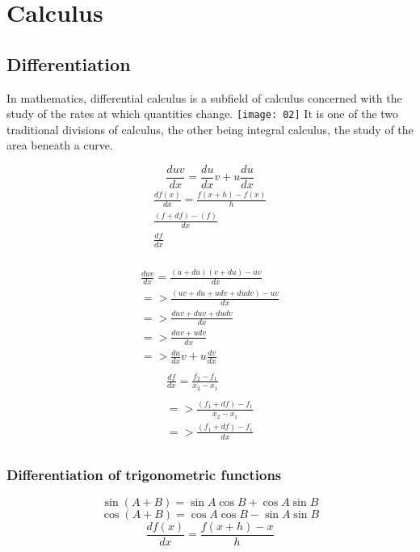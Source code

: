 
\graphicspath{ {./Pictures/} }

\chapter{Calculus}



\section{Differentiation}
	In mathematics, differential calculus is a subfield of calculus concerned with the study of the rates at which quantities change.
	\texttt{[image: 02]}
	It is one of the two traditional divisions of calculus, the other being integral calculus, the study of the area beneath a curve.
	
	
	\begin{equation}
		\frac{duv}{dx}=\frac{du}{dx}v+u\frac{du}{dx}
	\end{equation}
	\begin{align}
		\frac{df(x)}{dx} = \frac{f(x+h)-f(x)}{h} \\
		\frac{(f+df)-(f)}{dx}	\\
		\frac{df}{dx} \\
	\end{align}
	
	\begin{align}
		\frac{duv}{dx} = \frac{(u+du)(v+du)-uv}{dx} \\
		=>\frac{(uv+du+udv+dudv)-uv}{dx} \\
		=> \frac{duv+duv+dudv}{dx} \\
		=> \frac{duv+udv}{dx} \\
		=> \frac{du}{dx}v+u\frac{dv}{dx} \\
	\end{align}
	\begin{align}
		\frac{df}{dx} = \frac{f_2-f_1}{x_2-x_1} \\\\
		=>\frac{(f_1+df)-f_1}{x_2-x_1} \\
		=>\frac{(f_1+df)-f_1}{dx} \\
	\end{align}

	
	
	
	\subsection{Differentiation of trigonometric functions}
	\begin{equation}
		\sin(A+B) = \sin A\cos B+\cos A\sin B
	\end{equation}
	\begin{equation}
		\cos(A+B) = \cos A\cos B - \sin A\sin B
	\end{equation}
	\begin{equation}
		\frac{df(x)}{dx} = \frac{f(x+h)-x}{h}
	\end{equation}
		
